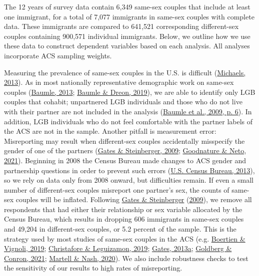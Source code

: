 \documentclass[
  12pt,
]{article}
\begin{document}
The 12 years of survey data contain 6,349 same-sex couples that include at least one immigrant, for a total of 7,077 immigrants in same-sex couples with complete data. These immigrants are compared to 641,521 corresponding different-sex couples containing 900,571 individual immigrants. Below, we outline how we use these data to construct dependent variables based on each analysis. All analyses incorporate ACS sampling weights.

Measuring the prevalence of same-sex couples in the U.S. is difficult (\protect\hyperlink{ref-michaels_2013}{Michaels, 2013}). As in most nationally representative demographic work on same-sex couples (\protect\hyperlink{ref-baumle_2013}{Baumle, 2013}; \protect\hyperlink{ref-baumle_2019}{Baumle \& Dreon, 2019}), we are able to identify only LGB couples that cohabit; unpartnered LGB individuals and those who do not live with their partner are not included in the analysis (\protect\hyperlink{ref-baumle_2009}{Baumle et al., 2009, p. 6}). In addition, LGB individuals who do not feel comfortable with the partner labels of the ACS are not in the sample. Another pitfall is measurement error: Misreporting may result when different-sex couples accidentally misspecify the gender of one of the partners (\protect\hyperlink{ref-gates_2009}{Gates \& Steinberger, 2009}; \protect\hyperlink{ref-goodnature_2021}{Goodnature \& Neto, 2021}). Beginning in 2008 the Census Bureau made changes to ACS gender and partnership questions in order to prevent such errors (\protect\hyperlink{ref-u.s.censusbureau_2013}{U.S. Census Bureau, 2013}), so we rely on data only from 2008 onward, but difficulties remain. If even a small number of different-sex couples misreport one partner's sex, the counts of same-sex couples will be inflated. Following \protect\hyperlink{ref-gates_2009}{Gates \& Steinberger} (\protect\hyperlink{ref-gates_2009}{2009}), we remove all respondents that had either their relationship or sex variable allocated by the Census Bureau, which results in dropping 606 immigrants in same-sex couples and 49,204 in different-sex couples, or 5.2 percent of the sample. This is the strategy used by most studies of same-sex couples in the ACS (e.g. \protect\hyperlink{ref-boertien_2019}{Boertien \& Vignoli, 2019}; \protect\hyperlink{ref-christafore_2019}{Christafore \& Leguizamon, 2019}; \protect\hyperlink{ref-gates_2013}{Gates, 2013a}; \protect\hyperlink{ref-goldberg_2021}{Goldberg \& Conron, 2021}; \protect\hyperlink{ref-martell_2020}{Martell \& Nash, 2020}). We also include robustness checks to test the sensitivity of our results to high rates of misreporting.
\end{document}
